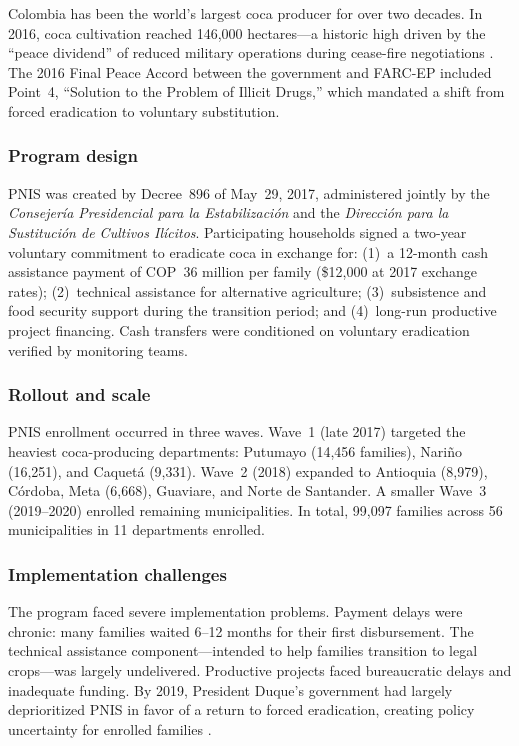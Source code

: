 \documentclass[12pt]{article}
\begin{document}
Colombia has been the world's largest coca producer for over two decades. In 2016, coca cultivation reached 146,000 hectares---a historic high driven by the ``peace dividend'' of reduced military operations during cease-fire negotiations \citep{unodc2017}. The 2016 Final Peace Accord between the government and FARC-EP included Point~4, ``Solution to the Problem of Illicit Drugs,'' which mandated a shift from forced eradication to voluntary substitution.

\subsubsection*{Program design} PNIS was created by Decree~896 of May~29, 2017, administered jointly by the \emph{Consejer\'{i}a Presidencial para la Estabilizaci\'{o}n} and the \emph{Direcci\'{o}n para la Sustituci\'{o}n de Cultivos Il\'{i}citos}. Participating households signed a two-year voluntary commitment to eradicate coca in exchange for: (1)~a 12-month cash assistance payment of COP~36 million per family (\$12,000 at 2017 exchange rates); (2)~technical assistance for alternative agriculture; (3)~subsistence and food security support during the transition period; and (4)~long-run productive project financing. Cash transfers were conditioned on voluntary eradication verified by monitoring teams.

\subsubsection*{Rollout and scale} PNIS enrollment occurred in three waves. Wave~1 (late 2017) targeted the heaviest coca-producing departments: Putumayo (14,456 families), Nari\~{n}o (16,251), and Caquet\'{a} (9,331). Wave~2 (2018) expanded to Antioquia (8,979), C\'{o}rdoba, Meta (6,668), Guaviare, and Norte de Santander. A smaller Wave~3 (2019--2020) enrolled remaining municipalities. In total, 99,097 families across 56 municipalities in 11 departments enrolled.

\subsubsection*{Implementation challenges} The program faced severe implementation problems. Payment delays were chronic: many families waited 6--12 months for their first disbursement. The technical assistance component---intended to help families transition to legal crops---was largely undelivered. Productive projects faced bureaucratic delays and inadequate funding. By 2019, President Duque's government had largely deprioritized PNIS in favor of a return to forced eradication, creating policy uncertainty for enrolled families \citep{fip2019}.
\end{document}
